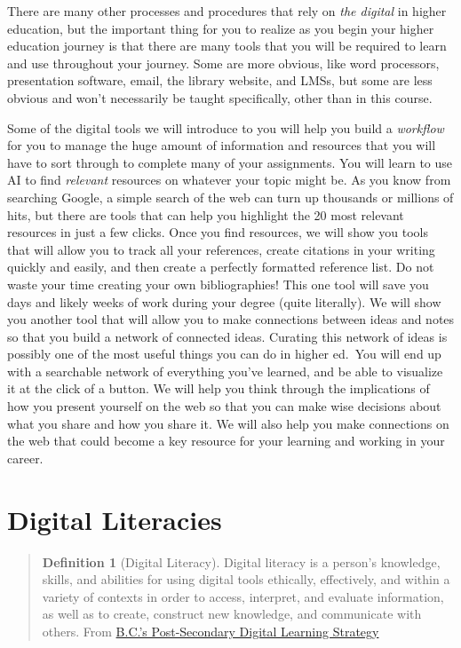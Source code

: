 \documentclass[
]{book}
\theoremstyle{definition}
\newtheorem{definition}{Definition}[chapter]
\theoremstyle{definition}
\theoremstyle{definition}
\theoremstyle{definition}
\theoremstyle{remark}
\begin{document}
There are many other processes and procedures that rely on \emph{the digital} in higher education, but the important thing for you to realize as you begin your higher education journey is that there are many tools that you will be required to learn and use throughout your journey. Some are more obvious, like word processors, presentation software, email, the library website, and LMSs, but some are less obvious and won't necessarily be taught specifically, other than in this course.

Some of the digital tools we will introduce to you will help you build a \emph{workflow} for you to manage the huge amount of information and resources that you will have to sort through to complete many of your assignments. You will learn to use AI to find \emph{relevant} resources on whatever your topic might be. As you know from searching Google, a simple search of the web can turn up thousands or millions of hits, but there are tools that can help you highlight the 20 most relevant resources in just a few clicks. Once you find resources, we will show you tools that will allow you to track all your references, create citations in your writing quickly and easily, and then create a perfectly formatted reference list. Do not waste your time creating your own bibliographies! This one tool will save you days and likely weeks of work during your degree (quite literally). We will show you another tool that will allow you to make connections between ideas and notes so that you build a network of connected ideas. Curating this network of ideas is possibly one of the most useful things you can do in higher ed.~You will end up with a searchable network of everything you've learned, and be able to visualize it at the click of a button. We will help you think through the implications of how you present yourself on the web so that you can make wise decisions about what you share and how you share it. We will also help you make connections on the web that could become a key resource for your learning and working in your career.

\hypertarget{digital-literacies}{%
\section{Digital Literacies}\label{digital-literacies}}

\begin{quote}
\begin{definition}[Digital Literacy]
\protect\hypertarget{def:diglit}{}\label{def:diglit}Digital literacy is a person's knowledge, skills, and abilities for using digital tools ethically, effectively, and within a variety of contexts in order to access, interpret, and evaluate information, as well as to create, construct new knowledge, and communicate with others. From \href{https://www2.gov.bc.ca/assets/gov/education/post-secondary-education/institution-resources-administration/digital-learning-strategy/digital_learning_strategy.pdf}{B.C.'s Post-Secondary Digital Learning Strategy}
\end{definition}
\end{quote}
\end{document}
